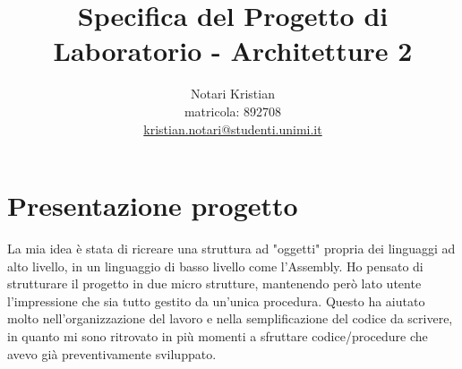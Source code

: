 \documentclass[a4paper]{article}
\title{Specifica del Progetto di Laboratorio - Architetture 2}
\author{Notari Kristian
\\ matricola: 892708\\ \url{kristian.notari@studenti.unimi.it}}
\date{} %
\begin{document}
\maketitle


\section{Presentazione progetto}
La mia idea è stata di ricreare una struttura ad "oggetti" propria dei linguaggi ad alto livello, in un linguaggio di basso livello come l'Assembly. Ho pensato di strutturare il progetto in due micro strutture, mantenendo però lato utente l'impressione che sia tutto gestito da un'unica procedura. Questo ha aiutato molto nell'organizzazione del lavoro e nella semplificazione del codice da scrivere, in quanto mi sono ritrovato in più momenti a sfruttare codice/procedure che avevo già preventivamente sviluppato.
\end{document}
